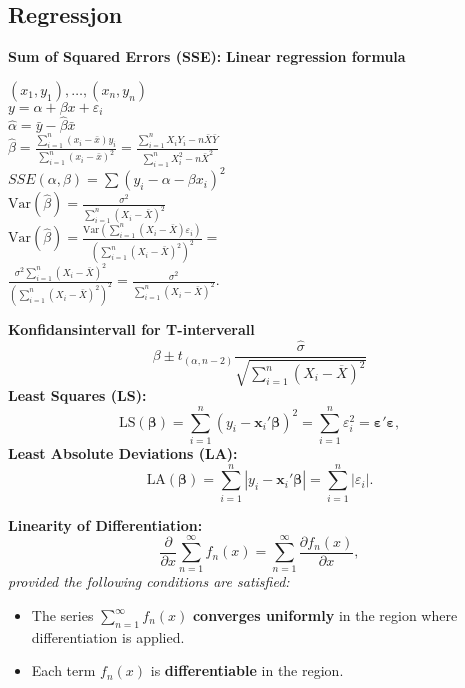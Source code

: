 \documentclass[a4paper,7pt,fleqn]{article}
\begin{document}
\begin{multicols}{2}
    \section*{Regressjon}
    
    \begin{minipage}{\linewidth}
    
    \textbf{Sum of Squared Errors (SSE):}
    \textbf{Linear regression formula} 
    
    \((x_1, y_1), \ldots, (x_n, y_n)\) \\
    \(y = \alpha + \beta x + \varepsilon_i\) \\
    \(\hat{\alpha} = \bar{y} - \hat{\beta} \bar{x}\) \\
    \(\hat{\beta} = \frac{\sum_{i=1}^n (x_i - \bar{x}) y_i}{\sum_{i=1}^n (x_i - \bar{x})^2} = \frac{\sum_{i=1}^n X_i Y_i - n \bar{X} \bar{Y}}{\sum_{i=1}^n X_i^2 - n \bar{X}^2}\) \\
    \(SSE(\alpha, \beta) = \sum \left( y_i - \alpha - \beta x_i \right)^2\) \\
    \(\text{Var}(\hat{\beta}) = \frac{\sigma^2}{\sum_{i=1}^n (X_i - \bar{X})^2}\) \\
    \(\text{Var}(\hat{\beta}) = \frac{\text{Var}\left(\sum_{i=1}^n (X_i - \bar{X}) \varepsilon_i \right)}{\left(\sum_{i=1}^n (X_i - \bar{X})^2\right)^2} = \) \\
    \( \frac{\sigma^2 \sum_{i=1}^n (X_i - \bar{X})^2}{\left(\sum_{i=1}^n (X_i - \bar{X})^2\right)^2} = \frac{\sigma^2}{\sum_{i=1}^n (X_i - \bar{X})^2}.\)
    
    \textbf{Konfidansintervall for T-interverall} 
    \[
    \beta\pm t_{(\alpha, n-2)}  \frac{\hat{\sigma}}{\sqrt{\sum_{i=1}^n (X_i - \overline{X})^2}}
    \]
    \textbf{Least Squares (LS):}
    \[
    \text{LS}(\boldsymbol{\beta}) = \sum_{i=1}^n (y_i - \mathbf{x}_i'\boldsymbol{\beta})^2 = \sum_{i=1}^n \varepsilon_i^2 = \boldsymbol{\varepsilon}'\boldsymbol{\varepsilon},
    \]
    \textbf{Least Absolute Deviations (LA):}
    \[
    \text{LA}(\boldsymbol{\beta}) = \sum_{i=1}^n |y_i - \mathbf{x}_i'\boldsymbol{\beta}| = \sum_{i=1}^n |\varepsilon_i|.
    \]
    
    
    \end{minipage}
    





    \begin{minipage}{\linewidth}
    \textbf{Linearity of Differentiation:}  
    \[
    \frac{\partial}{\partial x} \sum_{n=1}^\infty f_n(x) = \sum_{n=1}^\infty \frac{\partial f_n(x)}{\partial x},
    \]
    \textit{provided the following conditions are satisfied:}
    \begin{itemize}
        \item The series \(\sum_{n=1}^\infty f_n(x)\) \textbf{converges uniformly} in the region where differentiation is applied.
        \item Each term \(f_n(x)\) is \textbf{differentiable} in the region.
    \end{itemize}
    

\end{minipage}
\end{multicols}
\end{document}
